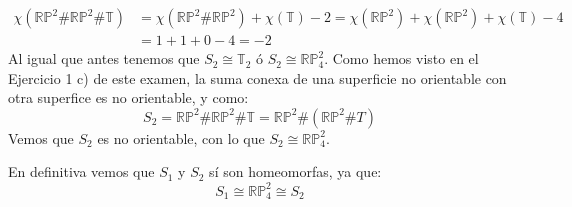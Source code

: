 \documentclass[12pt]{article}
\begin{document}
\begin{ejercicio}
\begin{enumerate}[label=\alph*)]
\begin{align*}
                    \chi(\mathbb{R}\mathbb{P}^2\# \mathbb{R}\mathbb{P}^2\# \mathbb{T}) &= \chi(\mathbb{R}\mathbb{P}^2\# \mathbb{R}\mathbb{P}^2) + \chi(\mathbb{T}) -2 = \chi(\mathbb{R}\mathbb{P}^2) + \chi(\mathbb{R}\mathbb{P}^2) + \chi(\mathbb{T}) - 4 \\
                                                                                       &= 1 + 1 + 0 - 4 = -2
                \end{align*}
                Al igual que antes tenemos que $S_2\cong \mathbb{T}_2$ ó $S_2\cong \mathbb{R}\mathbb{P}^2_4$. Como hemos visto en el Ejercicio 1 c) de este examen, la suma conexa de una superficie no orientable con otra superfice es no orientable, y como:
                \begin{equation*}
                    S_2 = \mathbb{R}\mathbb{P}^2\# \mathbb{R}\mathbb{P}^2\# \mathbb{T} = \mathbb{R}\mathbb{P}^2\# (\mathbb{R}\mathbb{P}^2\# T)
                \end{equation*}
                Vemos que $S_2$ es no orientable, con lo que $S_2\cong \mathbb{R}\mathbb{P}^2_4$. 
        \end{enumerate}
        En definitiva vemos que $S_1$ y $S_2$ sí son homeomorfas, ya que:
        \begin{equation*}
            S_1 \cong \mathbb{R}\mathbb{P}^2_4 \cong S_2
        \end{equation*}
    \end{ejercicio}
\end{document}
